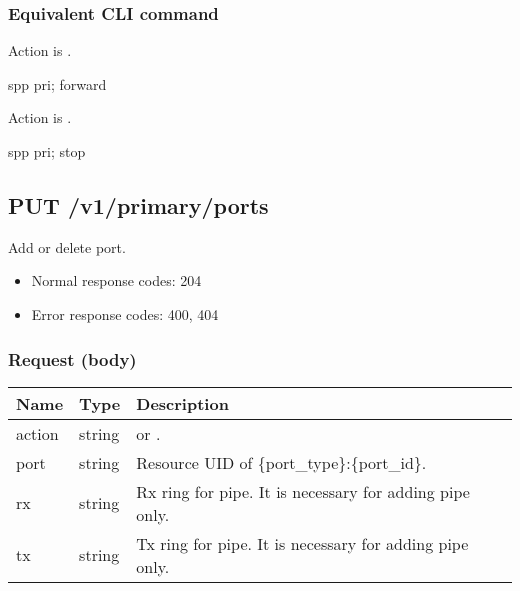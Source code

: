 \documentclass[a4paper,11pt,openany,oneside,english]{sphinxmanual}
\begin{document}
\subsubsection{Equivalent CLI command}
\label{\detokenize{api_ref/spp_primary:equivalent-cli-command}}
Action is .

\begin{sphinxVerbatim}[commandchars=\\\{\},formatcom=\footnotesize]
spp \PYGZgt{} pri; forward
\end{sphinxVerbatim}

Action is .

\begin{sphinxVerbatim}[commandchars=\\\{\},formatcom=\footnotesize]
spp \PYGZgt{} pri; stop
\end{sphinxVerbatim}


\subsection{PUT /v1/primary/ports}
\label{\detokenize{api_ref/spp_primary:put-v1-primary-ports}}\label{\detokenize{api_ref/spp_primary:api-spp-ctl-spp-primary-put-ports}}
Add or delete port.
\begin{itemize}
\item {} 
Normal response codes: 204

\item {} 
Error response codes: 400, 404

\end{itemize}


\subsubsection{Request (body)}
\label{\detokenize{api_ref/spp_primary:request-body}}

\begin{savenotes}\sphinxattablestart
\centering
{}
\sphinxthecaptionisattop
{}\label{\detokenize{api_ref/spp_primary:id37}}\label{\detokenize{api_ref/spp_primary:table-spp-ctl-spp-primary-ports-get-body}}
\sphinxaftertopcaption
\begin{tabulary}{\linewidth}[t]{|T|T|T|}
\hline
\sphinxstyletheadfamily 
Name
&\sphinxstyletheadfamily 
Type
&\sphinxstyletheadfamily 
Description
\\
\hline
action
&
string
&
 or .
\\
\hline
port
&
string
&
Resource UID of \{port\_type\}:\{port\_id\}.
\\
\hline
rx
&
string
&
Rx ring for pipe. It is necessary for adding pipe only.
\\
\hline
tx
&
string
&
Tx ring for pipe. It is necessary for adding pipe only.
\\
\hline
\end{tabulary}
\par
\sphinxattableend\end{savenotes}
\end{document}
